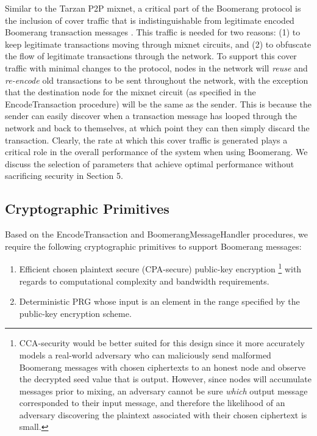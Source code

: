 Similar to the Tarzan P2P mixnet, a critical part of the Boomerang protocol is the inclusion of cover traffic that is indistinguishable from legitimate encoded Boomerang transaction messages \cite{tarzan}. This traffic is needed for two reasons: (1) to keep legitimate transactions moving through mixnet circuits, and (2) to obfuscate the flow of legitimate transactions through the network. To support this cover traffic with minimal changes to the protocol, nodes in the network will \emph{reuse} and \emph{re-encode} old transactions to be sent throughout the network, with the exception that the destination node for the mixnet circuit (as specified in the {\sf EncodeTransaction} procedure) will be the same as the sender. This is because the sender can easily discover when a transaction message has looped through the network and back to themselves, at which point they can then simply discard the transaction. Clearly, the rate at which this cover traffic is generated plays a critical role in the overall performance of the system when using Boomerang. We discuss the selection of parameters that achieve optimal performance without sacrificing security in Section 5. 

\subsection{Cryptographic Primitives}

Based on the {\sf EncodeTransaction} and {\sf BoomerangMessageHandler} procedures, we require the following cryptographic primitives to support Boomerang messages:
\begin{enumerate}
	\item Efficient chosen plaintext secure (CPA-secure) public-key encryption \footnote{CCA-security would be better suited for this design since it more accurately models a real-world adversary who can maliciously send malformed Boomerang messages with chosen ciphertexts to an honest node and observe the decrypted seed value that is output. However, since nodes will accumulate messages prior to mixing, an adversary cannot be sure \emph{which} output message corresponded to their input message, and therefore the likelihood of an adversary discovering the plaintext associated with their chosen ciphertext is small.} with regards to computational complexity and bandwidth requirements. 
	\item Deterministic PRG whose input is an element in the range specified by the public-key encryption scheme.
\end{enumerate}

